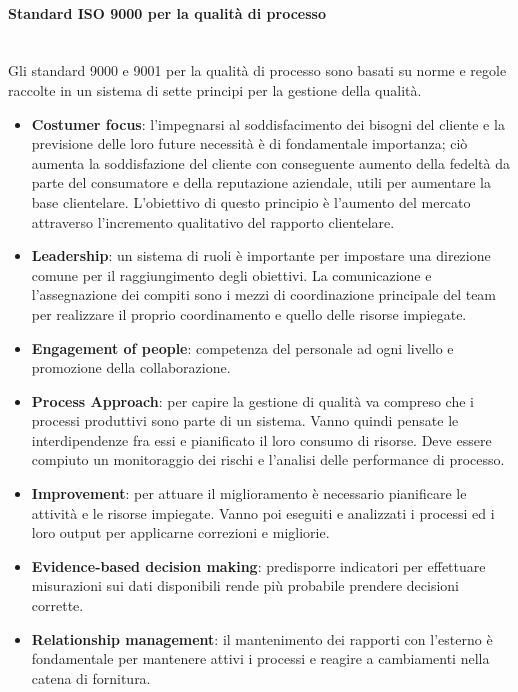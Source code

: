 \paragraph{Standard ISO 9000 per la qualità di processo}\label{sec:iso9000} \mbox{}\\
Gli standard  9000 e 9001 per la qualità di processo sono basati su norme e regole raccolte in un sistema di sette principi per la gestione della qualità.
\begin{itemize}
	\item \textbf{Costumer focus}: l'impegnarsi al soddisfacimento dei bisogni del cliente e la previsione delle loro future necessità è di fondamentale importanza; ciò aumenta la soddisfazione del cliente con conseguente aumento della fedeltà da parte del consumatore e della reputazione aziendale, utili per aumentare la base clientelare. L'obiettivo di questo principio è l'aumento del mercato attraverso l'incremento qualitativo del rapporto clientelare. 
	\item \textbf{Leadership}: un sistema di ruoli è importante per impostare una direzione comune per il raggiungimento degli obiettivi. La comunicazione e l'assegnazione dei compiti sono i mezzi di coordinazione principale del team per realizzare il proprio coordinamento e quello delle risorse impiegate.
	\item \textbf{Engagement of people}: competenza del personale ad ogni livello e promozione della collaborazione.
	\item \textbf{Process Approach}: per capire la gestione di qualità va compreso che i processi produttivi sono parte di un sistema. Vanno quindi pensate le interdipendenze fra essi e pianificato il loro consumo di risorse. Deve essere compiuto un monitoraggio dei rischi e l'analisi delle performance di processo.
	\item \textbf{Improvement}: per attuare il miglioramento è necessario pianificare le attività e le risorse impiegate. Vanno poi eseguiti e analizzati i processi ed i loro output per applicarne correzioni e migliorie.
	\item \textbf{Evidence-based decision making}: predisporre indicatori per effettuare misurazioni sui dati disponibili rende più probabile prendere decisioni corrette.
	\item \textbf{Relationship management}: il mantenimento dei rapporti con l'esterno è fondamentale per mantenere attivi i processi e reagire a cambiamenti nella catena di fornitura.
\end{itemize}

